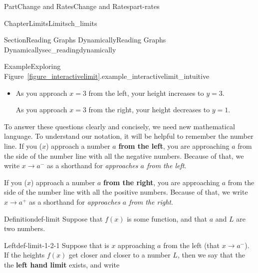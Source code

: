 \documentclass{tufte-book}
\newcommand{\xreffont}{\relax}
\newcommand{\terminology}[1]{\textbf{#1}}
\numberwithin{equation}{chapter}
\begin{document}
\begin{partptx}{Part}{Change and Rates}{}{Change and Rates}{}{}{part-rates}
\begin{chapterptx}{Chapter}{Limits}{}{Limits}{}{}{ch_limits}
\begin{sectionptx}{Section}{Reading Graphs Dynamically}{}{Reading Graphs Dynamically}{}{}{sec_readingdynamically}
\begin{example}{Example}{Exploring Figure~{\xreffont\ref*{figure_interactivelimit}}.}{example_interactivelimit_intuitive}
\begin{itemize}[label=\textbullet]
\begin{enumerate}
\end{enumerate}
%
\item{}As you approach \(x=3\) from the left, your height increases to \(y=3\).%
\par
As you approach \(x=3\) from the right, your height decreases to \(y=1\).%
\end{itemize}
\end{example}
To answer these questions clearly and concisely, we need new mathematical language. To understand our notation, it will be helpful to remember the number line. If you (\(x\)) approach a number \(a\) \terminology{from the left}, you are approaching \(a\) from the side of the number line with all the negative numbers. Because of that, we write \(x\rightarrow a^-\) as a shorthand for \emph{approaches \(a\) from the left}. \begin{image}{0.335}{0.33}{0.335}{}%
%
\end{image}%
 If you (\(x\)) approach a number \(a\) \terminology{from the right}, you are approaching \(a\) from the side of the number line with all the positive numbers. Because of that, we write \(x\rightarrow a^+\) as a shorthand for \emph{approaches \(a\) from the right}. \begin{image}{0.335}{0.33}{0.335}{}%
%
\end{image}%
%
\begin{definition}{Definition}{}{def-limit}%
Suppose that \(f(x)\) is some function, and that \(a\) and \(L\) are two numbers.%
%
\begin{descriptionlist}
\begin{dlimedium}{Left}{def-limit-1-2-1}%
Suppose that is \(x\) approaching \(a\) from the left (that \(x\rightarrow a^-\)). If the heights \(f(x)\) get closer and closer to a number \(L\), then we say that the the \terminology{left hand limit} exists, and write%

\end{dlimedium}
\end{descriptionlist}
\end{definition}
\end{sectionptx}
\end{chapterptx}
\end{partptx}
\end{document}
